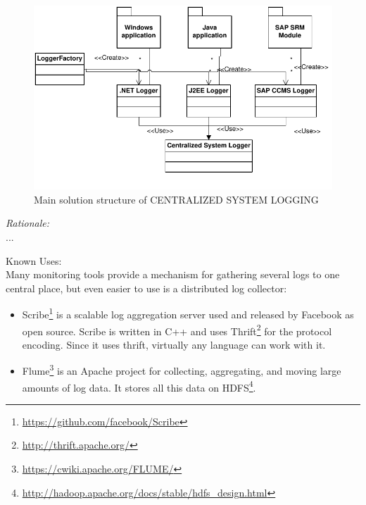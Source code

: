 \begin{figure}[h]
\centering
\includegraphics{patterns/systemLoggingDiagram.pdf}
\caption{Main solution structure of CENTRALIZED SYSTEM LOGGING}
\label{fig:systemLogging}
\end{figure}


\begin{center}
   
\end{center}

\textit{Rationale:}\\
...

Known Uses:\\
Many monitoring tools provide a mechanism for gathering several logs to one central place, but even easier to use is a distributed log collector:
\begin{itemize}
	\item Scribe\footnote{\url{https://github.com/facebook/Scribe}} is a scalable log aggregation server used and released by Facebook as open source. Scribe is written in C++ and uses Thrift\footnote{\url{http://thrift.apache.org/}} for the protocol encoding. Since it uses thrift, virtually any language can work with it.
	\item Flume\footnote{\url{https://cwiki.apache.org/FLUME/}} is an Apache project for collecting, aggregating, and moving large amounts of log data. It stores all this data on HDFS\footnote{\url{http://hadoop.apache.org/docs/stable/hdfs_design.html}}.
\end{itemize}

